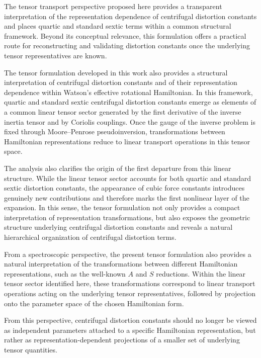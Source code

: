 \documentclass[journal=jacsat,manuscript=article]{achemso}
\begin{document}
The tensor transport perspective proposed here provides a transparent
interpretation of the representation dependence of centrifugal
distortion constants and places quartic and standard sextic terms
within a common structural framework. Beyond its conceptual relevance,
this formulation offers a practical route for reconstructing and
validating distortion constants once the underlying tensor
representatives are known.

The tensor formulation developed in this work also provides a
structural interpretation of centrifugal distortion constants and of
their representation dependence within Watson's effective rotational
Hamiltonian. In this framework, quartic and standard sextic
centrifugal distortion constants emerge as elements of a common linear
tensor sector generated by the first derivative of the inverse inertia
tensor and by Coriolis couplings. Once the gauge of the inverse
problem is fixed through Moore--Penrose pseudoinversion,
transformations between Hamiltonian representations reduce to linear
transport operations in this tensor space.

The analysis also clarifies the origin of the first departure from
this linear structure. While the linear tensor sector accounts for
both quartic and standard sextic distortion constants, the appearance
of cubic force constants introduces genuinely new contributions and
therefore marks the first nonlinear layer of the expansion. In this
sense, the tensor formulation not only provides a compact
interpretation of representation transformations, but also exposes the
geometric structure underlying centrifugal distortion constants and
reveals a natural hierarchical organization of centrifugal distortion
terms.

From a spectroscopic perspective, the present tensor formulation also
provides a natural interpretation of the transformations between
different Hamiltonian representations, such as the well-known $A$ and
$S$ reductions. Within the linear tensor sector identified here, these
transformations correspond to linear transport operations acting on the
underlying tensor representatives, followed by projection onto the
parameter space of the chosen Hamiltonian form.

From this perspective, centrifugal distortion constants should no
longer be viewed as independent parameters attached to a specific
Hamiltonian representation, but rather as representation-dependent
projections of a smaller set of underlying tensor quantities.
\end{document}
